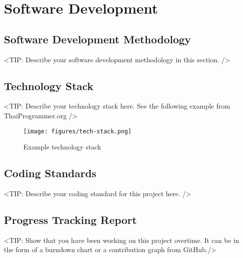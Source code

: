 \chapter{Software Development}
\label{ch:software-development}

\section{Software Development Methodology}
\label{sec:software-development-methodology}
<TIP: Describe your software development methodology in this section.
/>

\section{Technology Stack}
\label{sec:technology-stack}
<TIP: Describe your technology stack here.
See the following example from ThaiProgrammer.org />
\begin{figure}[h]
    \centering
    \texttt{[image: figures/tech-stack.png]}
    \caption{Example technology stack}
    \label{fig:figure6}
\end{figure}

\section{Coding Standards}
\label{sec:coding-standards}
<TIP: Describe your coding standard for this project here.
/>

\section{Progress Tracking Report}
\label{sec:progress-tracking-report}
<TIP: Show that you have been working on this project overtime.
It can be in the form of a burndown chart or a contribution graph from GitHub./>